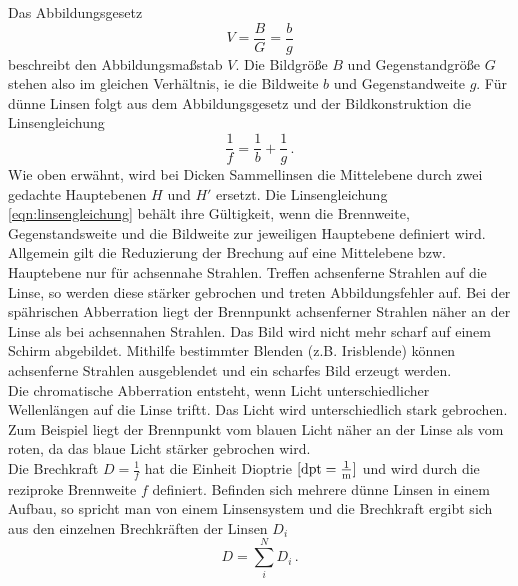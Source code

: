 Das Abbildungsgesetz
\begin{equation}
    V = \frac{B}{G} = \frac{b}{g}
    \label{eqn:abbildungsgesetz}
\end{equation}
beschreibt den Abbildungsmaßstab $V$.
Die Bildgröße $B$ und Gegenstandgröße $G$ stehen also im gleichen Verhältnis, ie die Bildweite $b$ und Gegenstandweite $g$.
Für dünne Linsen folgt aus dem Abbildungsgesetz und der Bildkonstruktion die Linsengleichung
\begin{equation}
    \frac{1}{f} = \frac{1}{b} + \frac{1}{g} \, .
    \label{eqn:linsengleichung}
\end{equation}
Wie oben erwähnt, wird bei Dicken Sammellinsen die Mittelebene durch zwei gedachte Hauptebenen $H$ und $H'$ ersetzt.
Die Linsengleichung \ref{eqn:linsengleichung} behält ihre Gültigkeit, wenn die Brennweite, Gegenstandsweite und die Bildweite zur jeweiligen Hauptebene definiert wird.
\\
Allgemein gilt die Reduzierung der Brechung auf eine Mittelebene bzw. Hauptebene nur für achsennahe Strahlen.
Treffen achsenferne Strahlen auf die Linse, so werden diese stärker gebrochen und treten Abbildungsfehler auf.
Bei der spährischen Abberration liegt der Brennpunkt achsenferner Strahlen näher an der Linse als bei achsennahen Strahlen.
Das Bild wird nicht mehr scharf auf einem Schirm abgebildet.
Mithilfe bestimmter Blenden (z.B. Irisblende) können achsenferne Strahlen ausgeblendet und ein scharfes Bild erzeugt werden.
\\
Die chromatische Abberration entsteht, wenn Licht unterschiedlicher Wellenlängen auf die Linse triftt.
Das Licht wird unterschiedlich stark gebrochen.
Zum Beispiel liegt der Brennpunkt vom blauen Licht näher an der Linse als vom roten, da das blaue Licht stärker gebrochen wird.
\\
Die Brechkraft $D=\frac{1}{f}$ hat die Einheit Dioptrie $[\text{dpt}=\si{\frac{1}{\metre}}]$ und wird durch die reziproke Brennweite $f$ definiert.
Befinden sich mehrere dünne Linsen in einem Aufbau, so spricht man von einem Linsensystem und die Brechkraft ergibt sich aus den einzelnen Brechkräften der Linsen $D_i$
\begin{equation}
    D = \sum_i^N D_i \, .
    \label{eqn:linsensystem}
\end{equation}
\FloatBarrier
\newpage

